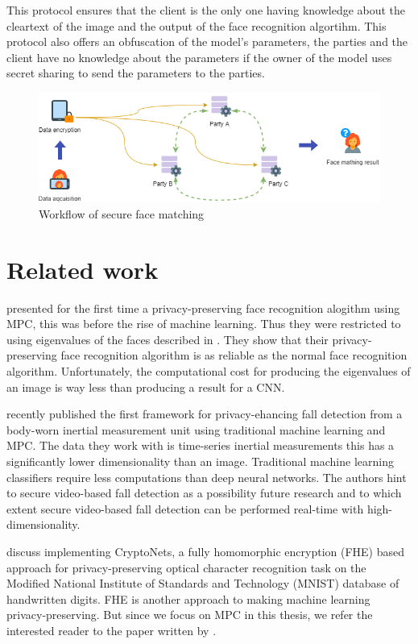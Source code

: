 This protocol ensures that the client is the only one having knowledge about the cleartext of the image and the output of the face recognition algortihm. This protocol also offers an obfuscation of the model's parameters, the parties and the client have no knowledge about the parameters if the owner of the model uses secret sharing to send the parameters to the parties.

\begin{figure}
  \includegraphics[width=\linewidth]{fig/workflow.png}
  \caption{Workflow of secure face matching}
  \label{fig:workflow}
\end{figure}

\section{Related work}
\cite{erkin2009privacy} presented for the first time a privacy-preserving face recognition alogithm using MPC, this was before the rise of machine learning. Thus they were restricted to using eigenvalues of the faces described in \cite{turk1991face}. They show that their privacy-preserving face recognition algorithm is as reliable as the normal face recognition algorithm. Unfortunately, the computational cost for producing the eigenvalues of an image is way less than producing a result for a CNN.

\cite{mainali2019privacy} recently published the first framework for privacy-ehancing fall detection from a body-worn inertial measurement unit using traditional machine learning and MPC. The data they work with is time-series inertial measurements this has a significantly lower dimensionality than an image. Traditional machine learning classifiers require less computations than deep neural networks. The authors hint to secure video-based fall detection as a possibility future research and to which extent secure video-based fall detection can be performed real-time with high-dimensionality.

\cite{gilad2016cryptonets} discuss implementing CryptoNets, a fully homomorphic encryption (FHE) based approach for privacy-preserving optical character recognition task on the Modified National Institute of Standards and Technology (MNIST) database of handwritten digits. FHE is another approach to making machine learning privacy-preserving. But since we focus on MPC in this thesis, we refer the interested reader to the paper written by \cite{gentry2009fully}.

